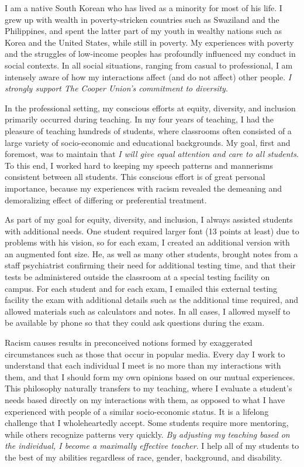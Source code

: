 \documentclass[a4paper,11pt]{article}
\begin{document}
I am a native South Korean who has lived as a minority for most of his life. I grew up with wealth in poverty-stricken countries such as Swaziland and the Philippines, and spent the latter part of my youth in wealthy nations such as Korea and the United States, while still in poverty. My experiences with poverty and the struggles of low-income peoples has profoundly influenced my conduct in social contexts. In all social situations, ranging from casual to professional, I am intensely aware of how my interactions affect (and do not affect) other people. \textit{I strongly support The Cooper Union's commitment to diversity}.

In the professional setting, my conscious efforts at equity, diversity, and inclusion primarily occurred during teaching. In my four years of teaching, I had the pleasure of teaching hundreds of students, where classrooms often consisted of a large variety of socio-economic and educational backgrounds. My goal, first and foremost, was to maintain that \textit{I will give equal attention and care to all students}. To this end, I worked hard to keeping my speech patterns and mannerisms consistent between all students. This conscious effort is of great personal importance, because my experiences with racism revealed the demeaning and demoralizing effect of differing or preferential treatment.

As part of my goal for equity, diversity, and inclusion, I always assisted students with additional needs. One student required larger font (13 points at least) due to problems with his vision, so for each exam, I created an additional version with an augmented font size. He, as well as many other students, brought notes from a staff psychiatrist confirming their need for additional testing time, and that their tests be administered outside the classroom at a special testing facility on campus. For each student and for each exam, I emailed this external testing facility the exam with additional details such as the additional time required, and allowed materials such as calculators and notes. In all cases, I allowed myself to be available by phone so that they could ask questions during the exam.

Racism causes results in preconceived notions formed by exaggerated circumstances such as those that occur in popular media. Every day I work to understand that each individual I meet is no more than my interactions with them, and that I should form my own opinions based on our mutual experiences. This philosophy naturally transfers to my teaching, where I evaluate a student's needs based directly on my interactions with them, as opposed to what I have experienced with people of a similar socio-economic status. It is a lifelong challenge that I wholeheartedly accept. Some students require more mentoring, while others recognize patterns very quickly. \textit{By adjusting my teaching based on the individual, I become a maximally effective teacher}. I help all of my students to the best of my abilities regardless of race, gender, background, and disability.
\end{document}
